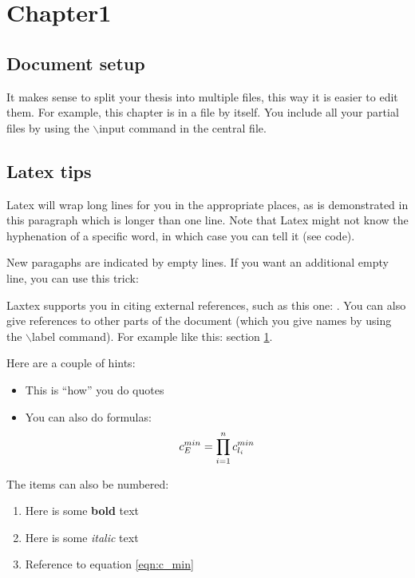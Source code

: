 \chapter{Chapter1}
\label{sec:introduction:related.work}

\section{Document setup}

It makes sense to split your thesis into multiple files, this way it is easier to edit them. For example, this chapter is in a file by itself. You include all your partial files by using the $\backslash$input command in the central file.

\section{Latex tips}


Latex will wrap long lines for you in the appropriate places, as is demonstrated in this paragraph which is longer than one line. Note that Latex might not know the hyphenation of a specific word, in which case you can tell it (see code).

New paragaphs are indicated by empty lines. If you want an additional empty line, you can use this trick:

\null

Laxtex supports you in citing external references, such as this one: \cite{examplecitation}.
You can also give references to other parts of the document (which you give names by using the $\backslash$label command). For example like this: section \ref{sec:introduction:related.work}.

 Here are a couple of hints:
\begin{itemize}
\item This is ``how'' you do quotes
\item You can also do formulas:
\begin{equation}
\label{eqn:c_min}
c^{min}_{E}=\prod_{i=1}^{n}{c^{min}_{l_i}}\\
\end{equation}
\end{itemize}

The items can also be numbered:
\begin{enumerate}
\item Here is some \textbf{bold} text
\item Here is some \textit{italic} text
\item Reference to equation \ref{eqn:c_min}
\end{enumerate}

